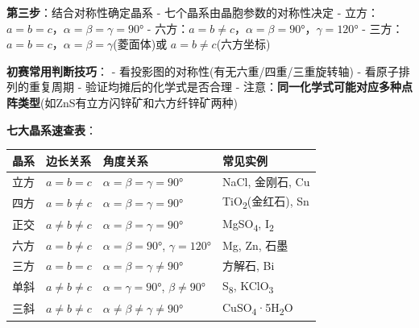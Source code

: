 \documentclass[a4paper,11pt]{ctexart}
\newcounter{none}
\newcommand{\箭}{\ensuremath{\rightarrow}}
\newcommand{\左箭}{\ensuremath{\leftarrow}}
\newcommand{\上箭}{\ensuremath{\uparrow}}
\newcommand{\下箭}{\ensuremath{\downarrow}}
\newcommand{\衡}{\ensuremath{\rightleftharpoons}}
\newcommand{\双箭}{\ensuremath{\leftrightarrow}}
\newcommand{\约等于}{\ensuremath{\approx}}
\newcommand{\小于等于}{\ensuremath{\leq}}
\newcommand{\大于等于}{\ensuremath{\geq}}
\newcommand{\不等于}{\ensuremath{\neq}}
\newcommand{\西格马}{\ensuremath{\sigma}}
\newcommand{\派}{\ensuremath{\pi}}
\begin{document}
\textbf{第三步}：结合对称性确定晶系
- 七个晶系由晶胞参数的对称性决定
- 立方：\(a=b=c\)，\(\alpha=\beta=\gamma=90°\)
- 六方：\(a=b \neq c\)，\(\alpha=\beta=90°\)，\(\gamma=120°\)
- 三方：\(a=b=c\)，\(\alpha=\beta=\gamma\)(菱面体)或 \(a=b \neq c\)(六方坐标)

\textbf{初赛常用判断技巧}：
- 看投影图的对称性(有无六重/四重/三重旋转轴)
- 看原子排列的重复周期
- 验证均摊后的化学式是否合理
- 注意：\textbf{同一化学式可能对应多种点阵类型}(如ZnS有立方闪锌矿和六方纤锌矿两种)

\textbf{七大晶系速查表}：

{\def\LTcaptype{none} %
\begin{longtable}[]{@{}
  >{\raggedright\arraybackslash}p{}
  >{\raggedright\arraybackslash}p{}
  >{\raggedright\arraybackslash}p{}
  >{\raggedright\arraybackslash}p{}@{}}
\toprule\noalign{}
\begin{minipage}[b]{\linewidth}\raggedright
晶系
\end{minipage} & \begin{minipage}[b]{\linewidth}\raggedright
边长关系
\end{minipage} & \begin{minipage}[b]{\linewidth}\raggedright
角度关系
\end{minipage} & \begin{minipage}[b]{\linewidth}\raggedright
常见实例
\end{minipage} \\
\midrule\noalign{}
\endhead
\bottomrule\noalign{}
\endlastfoot
立方 & \(a=b=c\) & \(\alpha=\beta=\gamma=90°\) & NaCl, 金刚石, Cu \\
四方 & \(a=b \neq c\) & \(\alpha=\beta=\gamma=90°\) & TiO\textsubscript{2}(金红石), Sn \\
正交 & \(a \neq b \neq c\) & \(\alpha=\beta=\gamma=90°\) & MgSO\textsubscript{4}, I\textsubscript{2} \\
六方 & \(a=b \neq c\) & \(\alpha=\beta=90°\), \(\gamma=120°\) & Mg, Zn, 石墨 \\
三方 & \(a=b=c\) & \(\alpha=\beta=\gamma \neq 90°\) & 方解石, Bi \\
单斜 & \(a \neq b \neq c\) & \(\alpha=\gamma=90°\), \(\beta \neq 90°\) & S\textsubscript{8}, KClO\textsubscript{3} \\
三斜 & \(a \neq b \neq c\) & \(\alpha \neq \beta \neq \gamma \neq 90°\) & CuSO\textsubscript{4}·5H\textsubscript{2}O \\
\end{longtable}
}
\end{document}

